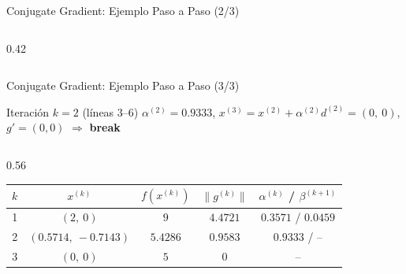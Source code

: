 \begin{frame}{Conjugate Gradient: Ejemplo Paso a Paso (2/3)}
\begin{columns}[T]
\begin{column}{0.42\textwidth}
        \end{column}
    \end{columns}
\end{frame}

\begin{frame}{Conjugate Gradient: Ejemplo Paso a Paso (3/3)}
    \begin{block}{Iteración $k=2$ (líneas 3--6)}
        \footnotesize
        $\alpha^{(2)}=0.9333$, \quad $x^{(3)}=x^{(2)}+\alpha^{(2)}d^{(2)}=(0,\ 0)$, \quad
        $g'=(0,0)$ $\Rightarrow$ \textbf{break}
    \end{block}

    \begin{columns}[T]
        \begin{column}{0.56\textwidth}
            \centering
            {\tiny
            \begin{tabular}{c c c c c}
                \toprule
                $k$ & $x^{(k)}$ & $f(x^{(k)})$ & $\lVert g^{(k)}\rVert$ & $\alpha^{(k)}$ / $\beta^{(k+1)}$ \\
                \midrule
                1 & $(2,\ 0)$ & $9$ & $4.4721$ & $0.3571$ / $0.0459$ \\
                2 & $(0.5714,\ -0.7143)$ & $5.4286$ & $0.9583$ & $0.9333$ / -- \\
                3 & $(0,\ 0)$ & $5$ & $0$ & -- \\
                \bottomrule
            \end{tabular}\par}


\end{column}
\end{columns}
\end{frame}
